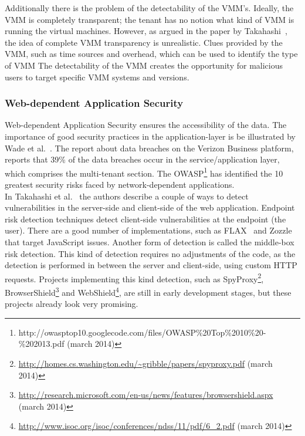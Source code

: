 Additionally there is the problem of the detectability of the \ac{VMM}’s. Ideally, the \ac{VMM} is completely transparent; the tenant has no notion what kind of \ac{VMM} is running the virtual machines. 
However, as argued in the paper by Takahashi~\cite{Takahashi2012Security}, the idea of complete \ac{VMM} transparency is unrealistic. 
Clues provided by the \ac{VMM}, such as time sources and overhead, which can be used to identify the type of \ac{VMM}
The detectability of the \ac{VMM} creates the opportunity for malicious users to target specific \ac{VMM} systems and versions.

\subsubsection{Web-dependent Application Security}
Web-dependent Application Security ensures the accessibility of the data. 
The importance of good security practices in the application-layer is be illustrated by Wade et al.~\cite{Wade2008Security}.
The report about data breaches on the Verizon Business platform, reports that 39\% of the data breaches occur in the service/application layer, which comprises the multi-tenant section. The \ac{OWASP}\footnote{http://owasptop10.googlecode.com/files/OWASP\%20Top\%2010\%20-\%202013.pdf (march 2014)} has identified the 10 greatest security risks faced by network-dependent applications.\\

In Takahashi et al.~\cite{Takahashi2012Security} the authors describe a couple of ways to detect vulnerabilities in the server-side and client-side of the web application. 
Endpoint risk detection techniques detect client-side vulnerabilities at the endpoint (the user). 
There are a good number of implementations, such as FLAX~\cite{saxena10kudzu} and Zozzle~\cite{curtsinger2011zozzle} that target JavaScript issues. 
Another form of detection is called the middle-box risk detection. 
This kind of detection requires no adjustments of the code, as the detection is performed in between the server and client-side, using custom HTTP requests. 
Projects implementing this kind detection, such as SpyProxy\footnote{\url{http://homes.cs.washington.edu/~gribble/papers/spyproxy.pdf} (march 2014)}, BrowserShield\footnote{\url{http://research.microsoft.com/en-us/news/features/browsershield.aspx} (march 2014)} and WebShield\footnote{\url{http://www.isoc.org/isoc/conferences/ndss/11/pdf/6_2.pdf} (march 2014)}, are still in early development stages, but these projects already look very promising.

